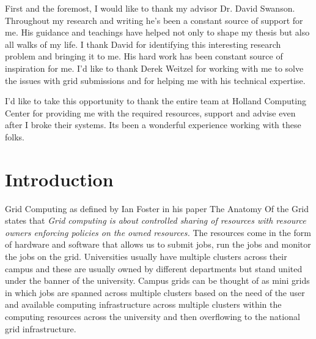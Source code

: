 \documentclass[ms,electronic,double]{nuthesis}
\begin{document}

\begin{acknowledgments}

First and the foremost, I would like to thank my advisor Dr. David Swanson. Throughout my research
and writing he's been a constant source of support for me. His guidance and teachings have helped not 
only to shape my thesis but also all walks of my life. I thank David for identifying this interesting
research problem and bringing it to me. His hard work has been constant source of inspiration
for me. I'd like to thank Derek Weitzel for working with me to solve the 
 issues with grid submissions and for helping me with his technical expertise.
 
 I'd like to take this opportunity to thank the entire team at Holland 
Computing Center for providing me with the required resources, support and advise
 even after I broke their systems. Its been a wonderful experience 
 working with these folks.
 
\end{acknowledgments}

\tableofcontents
\newpage
\listoffigures
\listoftables


\mainmatter

\chapter{Introduction}
Grid Computing as defined by Ian Foster in his paper The Anatomy Of the Grid \cite{Foster:2001:AGE:1080644.1080667}
states that 
\emph{Grid computing is about controlled sharing of resources with resource owners enforcing policies 
on the owned resources.} The resources come in the form of hardware 
and software that allows us to submit jobs, run the jobs and monitor the jobs on the grid. 
Universities usually have multiple clusters across their campus and these are 
usually owned by different departments but stand united under the banner of the university.
Campus grids can be thought of as mini grids in which jobs are spanned across multiple clusters
 based on the need of the user and available computing infrastructure 
across multiple clusters within the computing resources across the university and then overflowing to the national
grid infrastructure\cite{derekThesis}.
\end{document}
